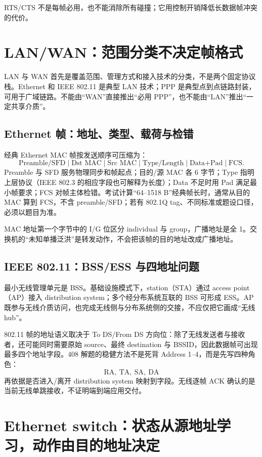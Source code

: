\documentclass[UTF8,fontset=none,11pt,a4paper]{ctexart}
\begin{document}
RTS/CTS
不是每帧必用，也不能消除所有碰撞；它用控制开销降低长数据帧冲突的代价。

\section{LAN/WAN：范围分类不决定帧格式}

LAN 与 WAN 首先是覆盖范围、管理方式和接入技术的分类，不是两个固定协议栈。Ethernet 和 IEEE 802.11 是典型 LAN 技术；PPP 是典型点到点链路封装，可用于广域链路。不能由“WAN”直接推出“必用 PPP”，也不能由“LAN”推出“一定共享介质”。

\subsection{Ethernet 帧：地址、类型、载荷与检错}

经典 Ethernet MAC 帧按发送顺序可压缩为：
\[
\boxed{\text{Preamble/SFD}\mid\text{Dst MAC}\mid\text{Src MAC}\mid
\text{Type/Length}\mid\text{Data+Pad}\mid\text{FCS}}.
\]
Preamble 与 SFD 服务物理同步和帧起点；目的/源 MAC 各 6 字节；Type 指明上层协议（IEEE 802.3 的相应字段也可解释为长度）；Data 不足时用 Pad 满足最小帧要求；FCS 对帧主体检错。考试计算“64--1518 B”经典帧长时，通常从目的 MAC 算到 FCS，不含 preamble/SFD；若有 802.1Q tag、不同标准或题设口径，必须以题目为准。

MAC 地址第一个字节中的 I/G 位区分 individual 与 group，广播地址是全 1。交换机的“未知单播泛洪”是转发动作，不会把该帧的目的地址改成广播地址。

\subsection{IEEE 802.11：BSS/ESS 与四地址问题}

最小无线管理单元是 BSS。基础设施模式下，station（STA）通过 access point（AP）接入 distribution system；多个经分布系统互联的 BSS 可形成 ESS。AP 既参与无线介质访问，也完成无线侧与分布系统侧的交接，不应仅把它画成“无线 hub”。

802.11 帧的地址语义取决于 To DS/From DS 方向位：除了无线发送者与接收者，还可能同时需要原始 source、最终 destination 与 BSSID，因此数据帧可出现最多四个地址字段。408 解题的稳健方法不是死背 Address 1--4，而是先写四种角色：
\[
\boxed{\text{RA},\ \text{TA},\ \text{SA},\ \text{DA}}
\]
再依据是否进入/离开 distribution system 映射到字段。无线逐帧 ACK 确认的是当前无线单跳接收，不证明端到端应用交付。

\section{Ethernet
switch：状态从源地址学习，动作由目的地址决定}\label{7-ethernet-switchux72b6ux6001ux4eceux6e90ux5730ux5740ux5b66ux4e60ux52a8ux4f5cux7531ux76eeux7684ux5730ux5740ux51b3ux5b9a}
\end{document}
